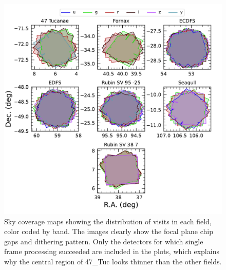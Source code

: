 %
\begin{figure}[ht]
\centering
 \includegraphics[width=\linewidth]{fieldSummaries}
 \caption{Sky coverage maps showing the distribution of visits in each field, color coded by band. The images clearly show the focal plane chip gaps and dithering pattern. Only the detectors for which single frame processing succeeded are included in the plots, which explains why the central region of 47\_Tuc looks thinner than the other fields. }
\label{fig:dp1_fields_coverage}
\end{figure}

